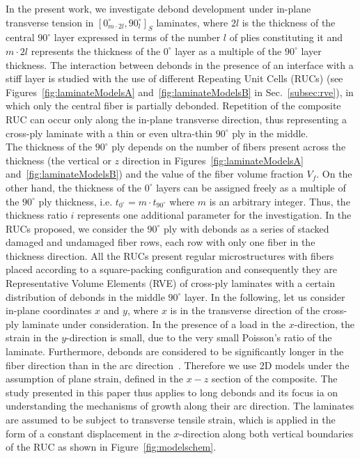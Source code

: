 \documentclass[review]{elsarticle}
\begin{document}
In the present work, we investigate debond development under in-plane transverse tension in $\left[0_{m\cdot2l}^{\circ},90_{l}^{\circ}\right]_{S}$ laminates, where $2l$ is the thickness of the central $90^{\circ}$ layer expressed in terms of the number $l$ of plies constituting it and $m\cdot2l$ represents the thickness of the $0^{\circ}$ layer as a multiple of the $90^{\circ}$ layer thickness. The interaction between debonds in the presence of an interface with a stiff layer is studied with the use of different Repeating Unit Cells (RUCs)  (see Figures~\ref{fig:laminateModelsA} and~\ref{fig:laminateModelsB} in Sec.~\ref{subsec:rve}), in which only the central fiber is partially debonded. Repetition of the composite RUC can occur only along the in-plane transverse direction, thus representing a cross-ply laminate with a thin or even ultra-thin $90^{\circ}$ ply in the middle.\\
The thickness of the $90^{\circ}$ ply depends on the number of fibers present across the thickness (the vertical or $z$ direction in Figures~\ref{fig:laminateModelsA} and~\ref{fig:laminateModelsB}) and the value of the fiber volume fraction $V_{f}$. On the other hand, the thickness of the $0^{\circ}$ layers can be assigned freely as a multiple of the $90^{\circ}$ ply thickness, i.e. $t_{0^{\circ}}=m\cdot t_{90^{\circ}}$ where $m$ is an arbitrary integer. Thus, the thickness ratio $i$ represents one additional parameter for the investigation. In the RUCs proposed, we consider the $90^{\circ}$ ply with debonds as a series of stacked damaged and undamaged fiber rows, each row with only one fiber in the thickness direction. All the RUCs present regular microstructures with fibers placed according to a square-packing configuration and consequently they are Representative Volume Elements (RVE) of cross-ply laminates with a certain distribution of debonds in the middle $90^{\circ}$ layer. In the following, let us consider in-plane coordinates $x$ and $y$, where $x$ is in the transverse direction of the cross-ply laminate under consideration. In the presence of a load in the $x$-direction, the strain in the $y$-direction is small, due to the very small Poisson's ratio of the laminate. Furthermore, debonds are considered to be significantly longer in the fiber direction than in the arc direction~\cite{Zhang1997}. Therefore we use 2D models under the assumption of plane strain, defined in the $x-z$ section of the composite. The study presented in this paper thus applies to long debonds and its focus ia on understanding the mechanisms of growth along their arc direction. The laminates are assumed to be subject to transverse tensile strain, which is applied in the form of a constant displacement in the $x$-direction along both vertical boundaries of the RUC as shown in  Figure~\ref{fig:modelschem}.\\
\end{document}
